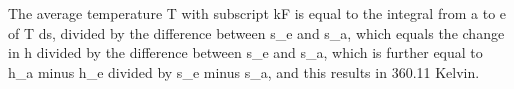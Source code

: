 The average temperature T with subscript kF is equal to the integral from a to e of T ds, divided by the difference between s_e and s_a, which equals the change in h divided by the difference between s_e and s_a, which is further equal to h_a minus h_e divided by s_e minus s_a, and this results in 360.11 Kelvin.